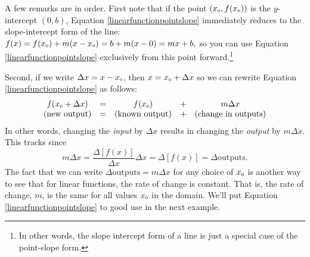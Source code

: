 \medskip

A few remarks are in order.  First note that if the point $(x_{\mbox{\tiny $0$}}, f(x_{\mbox{\tiny $0$}}))$ is the $y$-intercept $(0, b)$, Equation \ref{linearfunctionpointslope} immediately reduces to the slope-intercept form of the line: $ f(x) = f(x_{\mbox{\tiny $0$}}) + m (x - x_{\mbox{\tiny $0$}})  = b + m(x - 0) = mx + b,$ so you can use Equation \ref{linearfunctionpointslope} exclusively from this point forward.\footnote{In other words, the slope intercept form of a line is just a special case of the point-slope form.}

\medskip

Second, if we write $\Delta x = x - x_{\mbox{\tiny $0$}}$, then  $x = x_{\mbox{\tiny $0$}} + \Delta x$  so we can rewrite Equation \ref{linearfunctionpointslope}  as follows: \[ \begin{array}{ccccc}
 f(x_{\mbox{\tiny $0$}} + \Delta x) & = & f(x_{\mbox{\tiny $0$}}) & + & m \Delta x \\
 (\text{new output}) & = & (\text{known output}) & +&  (\text{change in outputs}) \\ \end{array} \] In other words, changing the \textit{input} by $\Delta x$ results in changing the \textit{output} by $m \Delta x$.  This tracks since \[ m \Delta x  = \dfrac{\Delta [f(x)]}{\Delta x} \Delta x =  \Delta[f(x)]  = \Delta \text{outputs}. \] The fact that we can write $\Delta \text{outputs} = m \Delta x$ for any choice of $x_{\mbox{\tiny $0$}}$ is another way to see that for linear functions, the rate of change is constant.  That is, the rate of change, $m$,  is the same for all values $x_{\mbox{\tiny $0$}}$ in the domain. We'll put Equation \ref{linearfunctionpointslope} to good use in the next example.
 
